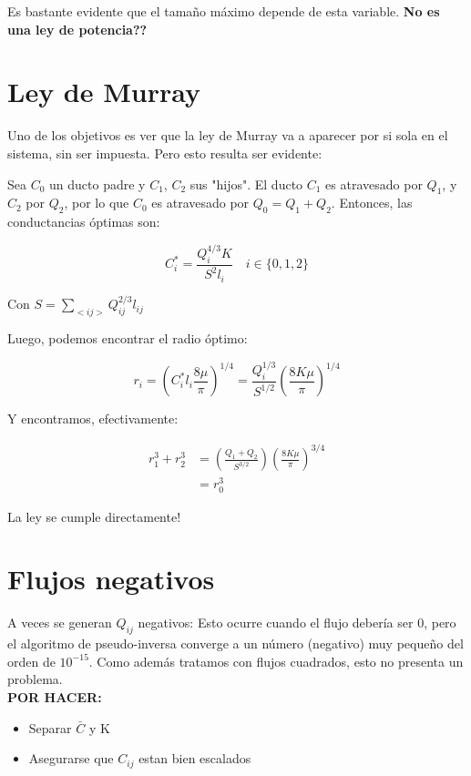\documentclass{article}
\begin{document}
Es bastante evidente que el tamaño máximo depende de esta variable. \textbf{No es una ley de potencia??}

\section{Ley de Murray}

Uno de los objetivos es ver que la ley de Murray va a aparecer por si sola en el sistema, sin ser impuesta.
Pero esto resulta ser evidente:

Sea $C_0$ un ducto padre y $C_1$, $C_2$ sus "hijos". El ducto $C_1$ es atravesado por $Q_1$, y $C_2$ por $Q_2$, por lo que $C_0$ es atravesado
por $Q_0 = Q_1 + Q_2$. Entonces, las conductancias óptimas son:

$$ C_i^* = \frac{Q_i^{4/3} K}{S^2 l_i} \quad i\in\{0,1,2\} $$

Con $ S = \sum_{<ij>}Q_{ij}^{2/3}l_{ij} $

Luego, podemos encontrar el radio óptimo:

$$ r_i = \left( C_i^* l_i \frac{8 \mu}{\pi} \right)^{1/4} = \frac{Q_i^{1/3}}{S^{1/2}}\left(\frac{8K\mu}{\pi}\right)^{1/4}$$

Y encontramos, efectivamente:

\begin{align*}
    r_1^3 + r_2^3 & = \left(\frac{Q_1 + Q_2}{S^{3/2}}\right)\left(\frac{8K\mu}{\pi}\right)^{3/4} \\
    & = r_0^3
\end{align*}

La ley se cumple directamente!

\section{Flujos negativos}

A veces se generan $Q_{ij}$ negativos: Esto ocurre cuando el flujo debería ser 0, pero el algoritmo de pseudo-inversa
converge a un número (negativo) muy pequeño del orden de $10^{-15}$. Como además tratamos con flujos cuadrados, esto no presenta un problema.
\\
\textbf{POR HACER:}

\begin{itemize}
    \item Separar $\bar{C}$ y K
    \item Asegurarse que $C_{ij}$ estan bien escalados
\end{itemize}
\end{document}
